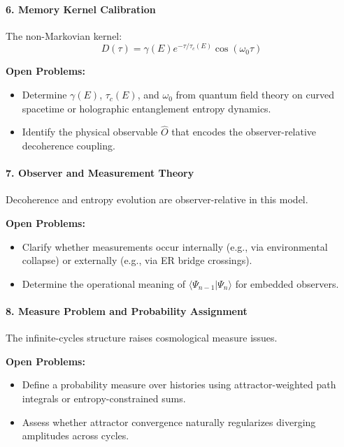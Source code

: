 \paragraph{6. Memory Kernel Calibration}

The non-Markovian kernel:
\[
D(\tau) = \gamma(E) e^{-\tau / \tau_c(E)} \cos(\omega_0 \tau)
\]

\textbf{Open Problems:}
\begin{itemize}
    \item Determine \( \gamma(E) \), \( \tau_c(E) \), and \( \omega_0 \) from quantum field theory on curved spacetime or holographic entanglement entropy dynamics.
    \item Identify the physical observable \( \hat{O} \) that encodes the observer-relative decoherence coupling.
\end{itemize}

\paragraph{7. Observer and Measurement Theory}

Decoherence and entropy evolution are observer-relative in this model.

\textbf{Open Problems:}
\begin{itemize}
    \item Clarify whether measurements occur internally (e.g., via environmental collapse) or externally (e.g., via ER bridge crossings).
    \item Determine the operational meaning of \( \langle \Psi_{n-1} | \Psi_n \rangle \) for embedded observers.
\end{itemize}

\paragraph{8. Measure Problem and Probability Assignment}

The infinite-cycles structure raises cosmological measure issues.

\textbf{Open Problems:}
\begin{itemize}
    \item Define a probability measure over histories using attractor-weighted path integrals or entropy-constrained sums.
    \item Assess whether attractor convergence naturally regularizes diverging amplitudes across cycles.
\end{itemize}

